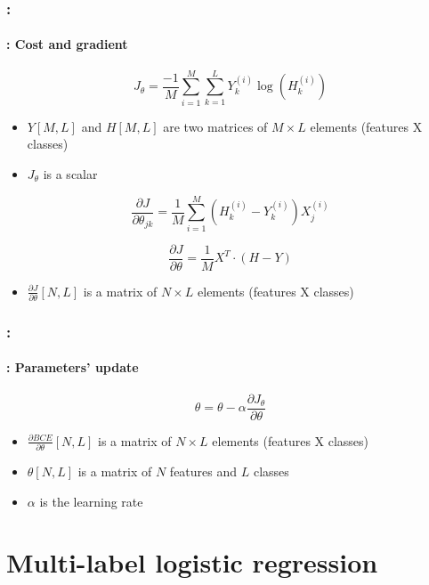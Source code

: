 \documentclass[xcolor=table]{beamer}
\begin{document}
\begin{frame}
	\frametitle{\insertshortsubtitle: \insertsection}
	\framesubtitle{\insertsubsection: Cost and gradient}
	
	\[J_\theta = \frac{-1}{M} \sum\limits_{i=1}^{M} \sum_{k=1}^{L} Y^{(i)}_k \log(H^{(i)}_k)\]
	\begin{itemize}
		\item $Y[M, L]$ and $H[M, L]$ are two matrices of $M\times L$ elements (features X classes)
		\item $J_\theta$ is a scalar
	\end{itemize}
	
	\[
	\frac{\partial J}{\partial \theta_{jk}} = \frac{1}{M} \sum\limits_{i=1}^{M} (H^{(i)}_k - Y^{(i)}_k) X_j^{(i)}
	\]
	
	\[
	\frac{\partial J}{\partial \theta} = \frac{1}{M} X^T \cdot (H - Y)
	\]
	
	\begin{itemize}
		\item $\frac{\partial J}{\partial \theta}[N, L]$ is a matrix of $N\times L$ elements (features X classes)
	\end{itemize}
	
\end{frame}

\begin{frame}
	\frametitle{\insertshortsubtitle: \insertsection}
	\framesubtitle{\insertsubsection: Parameters' update}
	
	\[\theta = \theta - \alpha \frac{\partial J_\theta}{\partial \theta}\]
	
	\begin{itemize}
		\item $\frac{\partial BCE}{\partial \theta}[N, L]$ is a matrix of $N\times L$ elements (features X classes)
		\item $\theta[N, L]$ is a matrix of $N$ features and $L$ classes
		\item $\alpha$ is the learning rate
	\end{itemize}
	
\end{frame}

\section{Multi-label logistic regression}

\begin{frame}
	\frametitle{\insertshortsubtitle}
	\framesubtitle{\insertsection}
	
	\begin{center}
		 \hskip1cm
	\end{center}
	
\end{frame}
\end{document}
